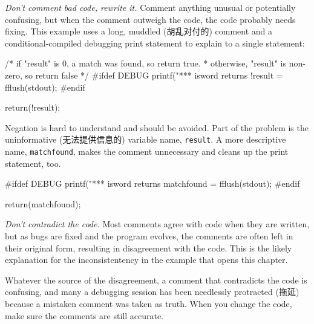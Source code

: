 \emph{Don't comment bad code, rewrite it.} Comment anything unusual or
potentially confusing, but when the comment outweigh the code, the code
probably needs fixing. This example uses a long, muddled (胡乱对付的)
comment and a conditional-compiled debugging print statement to explain to
a single statement:
\begin{badcode}
    /* if "result" is 0, a match was found, so return true.
     * otherwise, "result" is non-zero, so return false 
     */
    #ifdef DEBUG 
    printf("*** isword returns !result = %
    fflush(stdout);
    #endif

    return(!result);
\end{badcode}
Negation is hard to understand and should be avoided. Part of the problem
is the uninformative (无法提供信息的) variable name, \verb'result'. A more
descriptive name, \verb'matchfound', makes the comment unnecessary and
cleans up the print statement, too.
\begin{wellcode}
    #ifdef DEBUG
    printf("*** isword returns matchfound = %
    fflush(stdout);
    #endif

    return(matchfound);
\end{wellcode}

\emph{Don't contradict the code.} Most comments agree with code when they
are written, but as bugs are fixed and the program evolves, the comments
are often left in their original form, resulting in disagreement with the
code. This is the likely explanation for the inconsistentency in the
example that opens this chapter.

Whatever the source of the disagreement, a comment that contradicts the
code is confusing, and many a debugging session has been needlessly
protracted (拖延) because a mistaken comment was taken as truth. When you
change the code, make sure the comments are still accurate.


